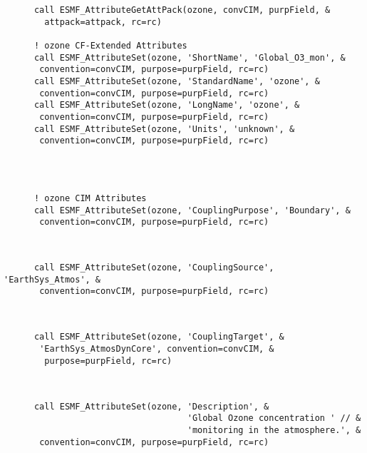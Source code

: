  \begin{verbatim}
      call ESMF_AttributeGetAttPack(ozone, convCIM, purpField, &
        attpack=attpack, rc=rc)

      ! ozone CF-Extended Attributes
      call ESMF_AttributeSet(ozone, 'ShortName', 'Global_O3_mon', &
       convention=convCIM, purpose=purpField, rc=rc)
      call ESMF_AttributeSet(ozone, 'StandardName', 'ozone', &
       convention=convCIM, purpose=purpField, rc=rc)
      call ESMF_AttributeSet(ozone, 'LongName', 'ozone', &
       convention=convCIM, purpose=purpField, rc=rc)
      call ESMF_AttributeSet(ozone, 'Units', 'unknown', &
       convention=convCIM, purpose=purpField, rc=rc)
 
\end{verbatim}
 

 \begin{verbatim}


      ! ozone CIM Attributes
      call ESMF_AttributeSet(ozone, 'CouplingPurpose', 'Boundary', &
       convention=convCIM, purpose=purpField, rc=rc)
 
\end{verbatim}
 

 \begin{verbatim}

      call ESMF_AttributeSet(ozone, 'CouplingSource', 'EarthSys_Atmos', &
       convention=convCIM, purpose=purpField, rc=rc)
 
\end{verbatim}
 

 \begin{verbatim}

      call ESMF_AttributeSet(ozone, 'CouplingTarget', &
       'EarthSys_AtmosDynCore', convention=convCIM, &
        purpose=purpField, rc=rc)
 
\end{verbatim}
 

 \begin{verbatim}

      call ESMF_AttributeSet(ozone, 'Description', &
                                    'Global Ozone concentration ' // &
                                    'monitoring in the atmosphere.', &
       convention=convCIM, purpose=purpField, rc=rc)
 
\end{verbatim}
 
